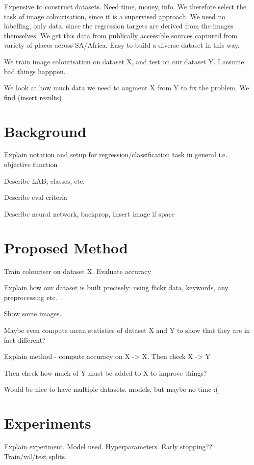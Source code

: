 \documentclass[conference]{IEEEtran}
\begin{document}
Expensive to construct datasets. Need time, money, info.
We therefore select the task of image colourisation, since it is a supervised approach. We need no labelling, only data, since the regression targets are derived from the images themselves!
We get this data from publically accessible sources captured from variety of places across SA/Africa. 
Easy to build a diverse dataset in this way. 

We train image colourisation on dataset X, and test on our dataset Y.  I assume bad things happpen.

We look at how much data we need to augment X from Y to fix the problem. We find (insert results) 

\section{Background}

Explain notation and setup for regression/classification task in general i.e. objective function

Describe LAB; classes, etc. 

Describe eval criteria

Describe neural network, backprop, Insert image if space


\section{Proposed Method}

Train colouriser on dataset X. Evaluate accuracy

Explain how our dataset is built precisely: using flickr data, keywords, any preprocessing etc. 

Show some images. 

Maybe even compute mean statistics of dataset X and Y to show that they are in fact different?

Explain method - compute accuracy on X -> X.
Then check X -> Y

Then check how much of Y must be added to X to improve things?

Would be nice to have multiple datasets, models, but maybe no time :(

\section{Experiments}

Explain experiment. Model used. Hyperparameters. Early stopping?? Train/val/test splits.
\end{document}
